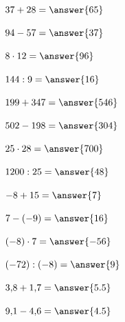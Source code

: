 \documentclass{ximera}
\begin{document}
\begin{oefening}[Rekenroutine A]{\oefB\ESS}

\begin{question} \(37+28=\answer{65}\) \end{question}

\begin{question} \(94-57=\answer{37}\) \end{question}

\begin{question} \(8\cdot12=\answer{96}\) \end{question}

\begin{question} \(144:9=\answer{16}\) \end{question}

\begin{question} \(199+347=\answer{546}\) \end{question}

\begin{question} \(502-198=\answer{304}\) \end{question}

\begin{question} \(25\cdot28=\answer{700}\) \end{question}

\begin{question} \(1200:25=\answer{48}\) \end{question}

\begin{question} \(-8+15=\answer{7}\) \end{question}

\begin{question} \(7-(-9)=\answer{16}\) \end{question}

\begin{question} \((-8)\cdot7=\answer{-56}\) \end{question}

\begin{question} \((-72):(-8)=\answer{9}\) \end{question}

\begin{question} \(3{,}8+1{,}7=\answer{5.5}\) \end{question}

\begin{question} \(9{,}1-4{,}6=\answer{4.5}\) \end{question}


\end{oefening}
\end{document}
